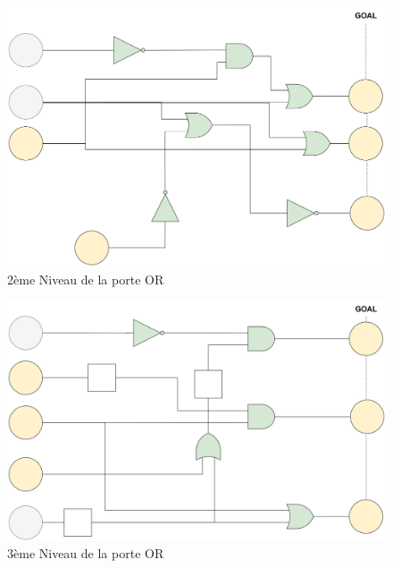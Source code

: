 \documentclass{article}
\begin{document}
\begin{figure}[h]
    \centering
    \includegraphics[width=\textwidth]{img/Levels-OR-2.jpg}
    \caption{2ème Niveau de la porte OR}
\end{figure}
\begin{figure}[h]
    \centering
    \includegraphics[width=\textwidth]{img/Levels-OR-3.jpg}
    \caption{3ème Niveau de la porte OR}
\end{figure}
\end{document}
